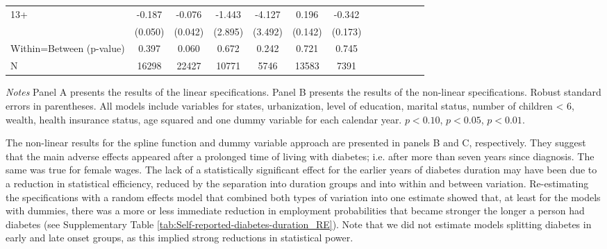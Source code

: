 \documentclass[10pt,letterpaper]{article}
\begin{document}
\begin{table}[!ht]
\begin{center}
\begin{adjustbox}{max width=\linewidth}
\begin{threeparttable}
{\begin{tabular}{l*{6}{S S}}
						13+&   -0.187\sym{***}&   -0.076\sym{*}  &   -1.443         &   -4.127         &    0.196         &   -0.342\sym{**} \\
						&  (0.050)         &  (0.042)         &  (2.895)         &  (3.492)         &  (0.142)         &  (0.173)         \\
						Within=Between (p-value)&  0.397         &    0.060         &    0.672         &    0.242         &    0.721         &    0.745         \\
						\midrule
						N         &    16298         &    22427         &    10771         &     5746         &    13583         &     7391         \\
						\bottomrule
					\end{tabular}
					\begin{tablenotes}
						\item \footnotesize \textit{Notes} Panel A presents the results of the linear specifications. Panel B presents the results of the non-linear specifications. Robust standard errors in parentheses. All models include variables for  states, urbanization, level of education, marital status, number of children < 6, wealth, health insurance status, age squared and one dummy variable for each calendar year. \sym{*} \(p<0.10\), \sym{**} \(p<0.05\), \sym{***} \(p<0.01\).
					\end{tablenotes}
				}
			\end{threeparttable}
		\end{adjustbox}
	\end{center}
\end{table}


The non-linear results for the spline function and dummy variable approach are  presented in panels B and C, respectively. They suggest that the main adverse effects appeared after a prolonged time of living with diabetes; i.e. after more than seven years since diagnosis. The same was true for female wages. The lack of a statistically significant effect for the earlier years of diabetes duration may have been due to a reduction in statistical efficiency, reduced by the separation into duration groups and into within and between variation. Re-estimating the specifications with a random effects model that combined both types of variation into one estimate showed that, at least for the models with dummies, there was a more or less immediate reduction in employment probabilities that became stronger the longer a person had diabetes (see Supplementary Table \ref{tab:Self-reported-diabetes-duration_RE}). Note that we did not estimate models splitting diabetes in early and late onset groups, as this implied strong reductions in statistical power.
\end{document}
